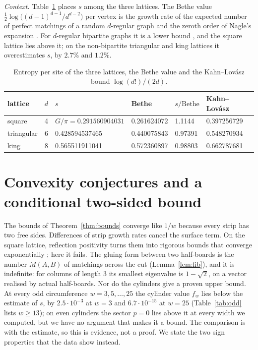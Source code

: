 \documentclass[11pt]{amsart}
\theoremstyle{definition}
\theoremstyle{remark}
\begin{document}
\emph{Context.} Table~\ref{tab:context} places $s$ among the three lattices. The Bethe value
$\frac12\log\bigl((d-1)^{d-1}/d^{d-2}\bigr)$ per vertex is the growth rate of the expected number of
perfect matchings of a random $d$-regular graph \cite{bollobasmckay1986} and the zeroth order of
Nagle's expansion \cite{nagle1966}. For $d$-regular bipartite graphs it is a lower bound
\cite{schrijver1998}, and the square lattice lies above it; on the non-bipartite triangular and
king lattices it overestimates $s$, by $2.7\%$ and $1.2\%$.

\begin{table}[ht]
\caption{Entropy per site of the three lattices, the Bethe value and the Kahn--Lov\'asz bound
$\log(d!)/(2d)$.}\label{tab:context}
\begin{tabular}{lrllll}
\toprule
lattice & $d$ & $s$ & Bethe & $s/\text{Bethe}$ & Kahn--Lov\'asz \\
\midrule
square     & 4 & $G/\pi = 0.291560904031$ & 0.261624072 & 1.1144  & 0.397256729 \\
triangular & 6 & 0.428594537465            & 0.440075843 & 0.97391 & 0.548270934 \\
king       & 8 & 0.565511911041            & 0.572360897 & 0.98803 & 0.662787681 \\
\bottomrule
\end{tabular}
\end{table}

\section{Convexity conjectures and a conditional two-sided bound}\label{sec:conj}

The bounds of Theorem~\ref{thm:bounds} converge like $1/w$ because every strip has two free
sides. Differences of strip growth rates cancel the surface term. On the square lattice,
reflection positivity turns them into rigorous bounds that converge exponentially
\cite{calkinwilf1998}; here it fails. The gluing form between two half-boards is the number
$M(A, B)$ of matchings across the cut (Lemma~\ref{lem:fib}), and it is indefinite: for columns of
length $3$ its smallest eigenvalue is $1 - \sqrt2$, on a vector realised by actual half-boards.
Nor do the cylinders give a proven upper bound. At every odd circumference $w = 3, 5, \dots, 25$ the
cylinder value $f_w$ lies below the estimate of $s$, by $2.5\cdot10^{-3}$ at $w = 3$ and
$6.7\cdot10^{-15}$ at $w = 25$ (Table~\ref{tab:odd} lists $w \ge 13$); on even cylinders the sector
$p = 0$ lies above it at every width we computed, but we have no argument that makes it a bound. The
comparison is with the estimate, so this is evidence, not a proof. We state the two sign properties
that the data show instead.
\end{document}
